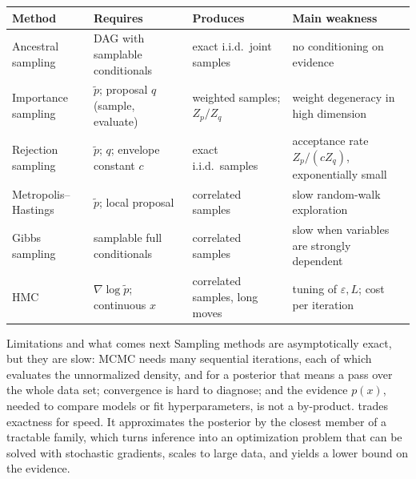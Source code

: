 \begin{center}
\small
\begin{tabularx}{\textwidth}{@{}l>{\raggedright\arraybackslash}X>{\raggedright\arraybackslash}X>{\raggedright\arraybackslash}X@{}}
\toprule
Method & Requires & Produces & Main weakness \\
\midrule
Ancestral sampling & DAG with samplable conditionals & exact i.i.d.\ joint samples & no conditioning on evidence \\
Importance sampling & $\tilde p$; proposal $q$ (sample, evaluate) & weighted samples; $Z_p/Z_q$ & weight degeneracy in high dimension \\
Rejection sampling & $\tilde p$; $q$; envelope constant $c$ & exact i.i.d.\ samples & acceptance rate $Z_p/(cZ_q)$, exponentially small \\
Metropolis--Hastings & $\tilde p$; local proposal & correlated samples & slow random-walk exploration \\
Gibbs sampling & samplable full conditionals & correlated samples & slow when variables are strongly dependent \\
HMC & $\nabla\log\tilde p$; continuous $x$ & correlated samples, long moves & tuning of $\varepsilon,L$; cost per iteration \\
\bottomrule
\end{tabularx}
\end{center}

\begin{notebox}{Limitations and what comes next}
Sampling methods are asymptotically exact, but they are slow: MCMC needs many sequential iterations, each of which evaluates the unnormalized density, and for a posterior that means a pass over the whole data set; convergence is hard to diagnose; and the evidence $p(x)$, needed to compare models or fit hyperparameters, is not a by-product.  trades exactness for speed. It approximates the posterior by the closest member of a tractable family, which turns inference into an optimization problem that can be solved with stochastic gradients, scales to large data, and yields a lower bound on the evidence.
\end{notebox}
